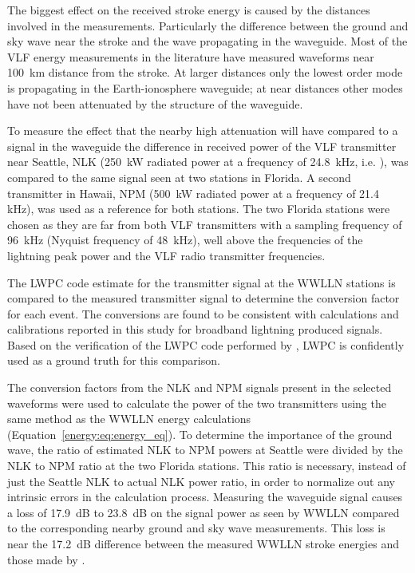 The biggest effect on the received stroke energy is caused by the distances involved in the measurements.
Particularly the difference between the ground and sky wave near the stroke and the wave propagating in the waveguide.
Most of the VLF energy measurements in the literature have measured waveforms near 100~km distance from the stroke.
At larger distances only the lowest order mode is propagating in the Earth-ionosphere waveguide; at near distances other modes have not been attenuated by the structure of the waveguide.

To measure the effect that the nearby high attenuation will have compared to a signal in the waveguide the difference in received power of the VLF transmitter near Seattle, NLK (250~kW radiated power at a frequency of 24.8~kHz, i.e. \citet{Clilverd2009}), was compared to the same signal seen at two stations in Florida.
A second transmitter in Hawaii, NPM (500~kW radiated power at a frequency of 21.4 kHz), was used as a reference for both stations.
The two Florida stations were chosen as they are far from both VLF transmitters with a sampling frequency of 96~kHz (Nyquist frequency of 48~kHz), well above the frequencies of the lightning peak power and the VLF radio transmitter frequencies.

The LWPC code estimate for the transmitter signal at the WWLLN stations is compared to the measured transmitter signal to determine the conversion factor for each event.
The conversions are found to be consistent with calculations and calibrations reported in this study for broadband lightning produced signals.
Based on the verification of the LWPC code performed by \citet{Thomson2010}, LWPC is confidently used as a ground truth for this comparison.

The conversion factors from the NLK and NPM signals present in the selected waveforms were used to calculate the power of the two transmitters using the same method as the WWLLN energy calculations (Equation~\ref{energy:eq:energy_eq}).
To determine the importance of the ground wave, the ratio of estimated NLK to NPM powers at Seattle were divided by the NLK to NPM ratio at the two Florida stations.
This ratio is necessary, instead of just the Seattle NLK to actual NLK power ratio, in order to normalize out any intrinsic errors in the calculation process.
Measuring the waveguide signal causes a loss of 17.9~dB to 23.8~dB on the signal power as seen by WWLLN compared to the corresponding nearby ground and sky wave measurements.
This loss is near the 17.2~dB difference between the measured WWLLN stroke energies and those made by \citet{Taylor1963}.

